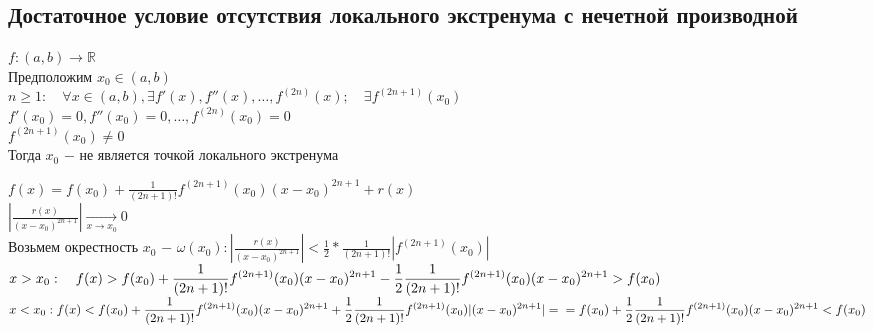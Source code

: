 \subsection{Достаточное условие отсутствия локального экстренума с нечетной производной}
\begin{theorem}
	$f: (a,b) \to \mathbb{R}$ \\
	Предположим $x_0 \in (a,b)$ \\
	$n\ge 1: \quad \forall x \in (a,b), \exists f'(x),f''(x),\ldots,f^{(2n)}(x); \quad \exists f^{(2n+1)}(x_0)$ \\
	$f'(x_0)=0,f''(x_0)=0,\ldots,f^{(2n)}(x_0)=0$ \\
	$f^{(2n+1)}(x_0)\neq 0$ \\
	Тогда $x_0$ $-$ не является точкой локального экстренума
\end{theorem}
\begin{replacementproof}
	$f(x)=f(x_0)+\displaystyle\frac{1}{(2n+1)!}f^{(2n+1)}(x_0)(x-x_0)^{2n+1}+r(x)$ \\
	$|\displaystyle\frac{r(x)}{(x-x_0)^{2n+1}}|\underset{x\to x_0}{\to} 0$ \\
	Возьмем окрестность $x_0$ $-$ $\omega(x_0): |\displaystyle\frac{r(x)}{(x-x_0)^{2n+1}}|<\displaystyle\frac{1}{2}*\displaystyle\frac{1}{(2n+1)!}|f^{(2n+1)}(x_0)|$ \\
	$x>x_0:\\ \quad f(x)>f(x_0)+\displaystyle\frac{1}{(2n+1)!}f^{(2n+1)}(x_0)(x-x_0)^{2n+1}-\displaystyle\frac{1}{2}\displaystyle\frac{1}{(2n+1)!}f^{(2n+1)}(x_0)(x-x_0)^{2n+1}>f(x_0)$\\
	$x<x_0:\\ f(x)<f(x_0)+\displaystyle\frac{1}{(2n+1)!}f^{(2n+1)}(x_0)(x-x_0)^{2n+1}+\displaystyle\frac{1}{2}\displaystyle\frac{1}{(2n+1)!}f^{(2n+1)}(x_0)|(x-x_0)^{2n+1}|=\\=f(x_0)+\displaystyle\frac{1}{2}\displaystyle\frac{1}{(2n+1)!}f^{(2n+1)}(x_0)(x-x_0)^{2n+1}<f(x_0)$
\end{replacementproof}


